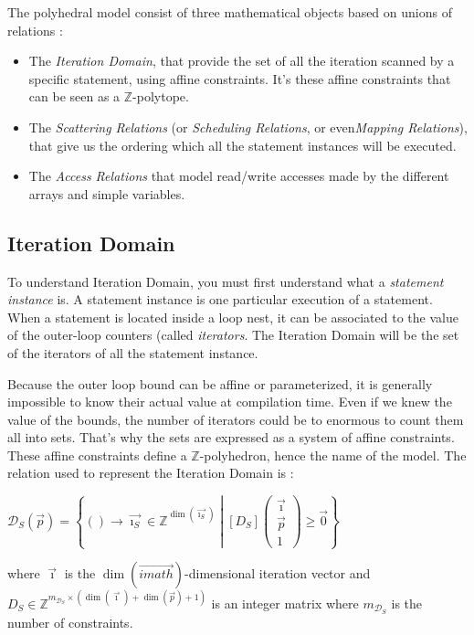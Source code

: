 \documentclass[paper=a4, fontsize=11pt]{scrartcl}
\numberwithin{equation}{section}        %
\numberwithin{figure}{section}          %
\numberwithin{table}{section}               %
\begin{document}
The polyhedral model consist of three mathematical objects based on unions of relations :
\begin{itemize}
    \item The \textit{Iteration Domain}, that provide the set of all the iteration scanned
        by a specific statement, using affine constraints. It's these affine constraints 
        that can be seen as a $\mathbb{Z}$-polytope.
    \item The \textit{Scattering Relations} (or \textit{Scheduling Relations},
        or even\textit{Mapping Relations}), that give us the ordering which
        all the statement instances will be executed.
    \item The \textit{Access Relations} that model read/write accesses made by
        the different arrays and simple variables.
\end{itemize}

    \subsection{Iteration Domain}
        To understand Iteration Domain, you must first understand what a \textit{statement instance}
        is. A statement instance is one particular execution of a statement.
        When a statement is located inside a loop nest, it can be associated to the value
        of the outer-loop counters (called \textit{iterators}.
        The Iteration Domain will be the set of the iterators of all the statement
        instance.

        Because the outer loop bound can be affine or parameterized, it is generally impossible to
        know their actual value at compilation time. Even if we knew the value of the
        bounds, the number of iterators could be to enormous to count them all into sets.
        That's why the sets are expressed as a system of affine constraints.
        These affine constraints define a $\mathbb{Z}$-polyhedron, hence the name of the model.
        The relation used to represent the Iteration Domain is :
        \begin{center}
            $ \mathcal{D}_S(\vec{p}) = \left\{() \to \vec{\imath_S} \in \mathbb{Z}^{\dim(\vec{\imath_S})}
            \middle|
            \left[D_S\right]\begin{pmatrix}\vec{\imath} \\ \vec{p} \\ 1\end{pmatrix}
            \geq \vec{0}
            \right\}$
        \end{center}
        where $\vec{\imath}$ is the $\dim(\vec{imath})$-dimensional iteration vector and
        $D_S \in \mathbb{Z}^{m_{\mathcal{D}_S} \times (\dim(\vec{\imath})+\dim(\vec{p})+1)}$
        is an integer matrix where $m_{\mathcal{D}_S}$ is the number of constraints.
        \\
\end{document}
